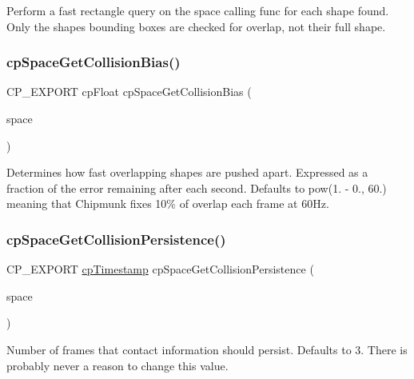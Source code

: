 Perform a fast rectangle query on the space calling {\ttfamily func} for each shape found. Only the shape\textquotesingle{}s bounding boxes are checked for overlap, not their full shape. \mbox{\label{group__cpSpace_ga53b093e1cbb978e00faf9216e1f9ab4f}} 
\subsubsection{\texorpdfstring{cp\+Space\+Get\+Collision\+Bias()}{cpSpaceGetCollisionBias()}}
{\footnotesize\ttfamily C\+P\+\_\+\+E\+X\+P\+O\+RT cp\+Float cp\+Space\+Get\+Collision\+Bias (\begin{DoxyParamCaption}\item[{const \hyperlink{structcpSpace}{cp\+Space} $\ast$}]{space }\end{DoxyParamCaption})}

Determines how fast overlapping shapes are pushed apart. Expressed as a fraction of the error remaining after each second. Defaults to pow(1. -\/ 0., 60.) meaning that Chipmunk fixes 10\% of overlap each frame at 60\+Hz. \mbox{\label{group__cpSpace_gac20dad9f3ef05f468773db3d7667c9ba}} 
\subsubsection{\texorpdfstring{cp\+Space\+Get\+Collision\+Persistence()}{cpSpaceGetCollisionPersistence()}}
{\footnotesize\ttfamily C\+P\+\_\+\+E\+X\+P\+O\+RT \hyperlink{group__basicTypes_gaa24652c104082d0725066ea5ac7dc83f}{cp\+Timestamp} cp\+Space\+Get\+Collision\+Persistence (\begin{DoxyParamCaption}\item[{const \hyperlink{structcpSpace}{cp\+Space} $\ast$}]{space }\end{DoxyParamCaption})}

Number of frames that contact information should persist. Defaults to 3. There is probably never a reason to change this value. \mbox{\label{group__cpSpace_ga7b5e6178a021b1b6bba4b70876bf79d0}} 
